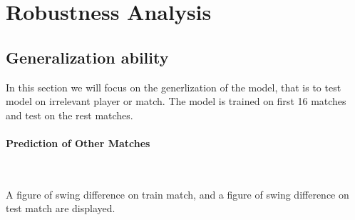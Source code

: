 \section{Robustness Analysis}

\subsection{Generalization ability}

In this section we will focus on the generlization of the model,
that is to test model on irrelevant player or match.
The model is trained on first 16 matches and test on the rest matches.

\paragraph{Prediction of Other Matches}~{}

A figure of swing difference on train match, and a figure of swing difference on test match are displayed.

